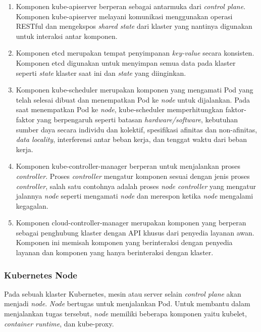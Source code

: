 \begin{enumerate}
  
  \item Komponen kube-apiserver berperan sebagai antarmuka dari \emph{control plane}.
    Komponen kube-apiserver melayani komunikasi menggunakan operasi RESTful dan
    mengekspos \emph{shared state} dari klaster yang nantinya digunakan untuk
    interaksi antar komponen.

  \item Komponen etcd merupakan tempat penyimpanan \emph{key-value} secara konsisten.
    Komponen etcd digunakan untuk menyimpan semua data pada klaster seperti \emph{state}
    klaster saat ini dan \emph{state} yang diinginkan.

  \item Komponen kube-scheduler merupakan komponen yang mengamati Pod yang telah
    selesai dibuat dan menempatkan Pod ke \emph{node} untuk dijalankan. Pada saat
    menempatkan Pod ke \emph{node}, kube-scheduler memperhitungkan faktor-faktor
    yang berpengaruh seperti batasan \emph{hardware/software}, kebutuhan sumber daya secara
    individu dan kolektif, spesifikasi afinitas dan non-afinitas, \emph{data locality}, interferensi
    antar beban kerja, dan tenggat waktu dari beban kerja.

  \item Komponen kube-controller-manager berperan untuk menjalankan proses \emph{controller}.
    Proses \emph{controller} mengatur komponen sesuai dengan jenis proses \emph{controller},
    salah satu contohnya adalah proses \emph{node controller} yang mengatur jalannya \emph{node}
    seperti mengamati \emph{node} dan merespon ketika \emph{node} mengalami kegagalan.

  \item Komponen cloud-controller-manager merupakan komponen yang berperan sebagai penghubung
    klaster dengan API khusus dari penyedia layanan awan. Komponen ini memisah
    komponen yang berinteraksi dengan penyedia layanan dan komponen yang hanya berinteraksi dengan
    klaster.

\end{enumerate}

\subsubsection{Kubernetes Node}

Pada sebuah klaster Kubernetes, mesin atau server selain \emph{control plane} akan menjadi \emph{node}.
\emph{Node} bertugas untuk menjalankan Pod. Untuk membantu dalam menjalankan tugas tersebut, \emph{node}
memiliki beberapa komponen yaitu kubelet, \emph{container runtime}, dan kube-proxy.

